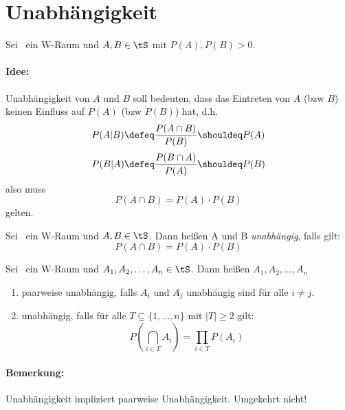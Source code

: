 \section{Unabhängigkeit}
Sei \wraum\ ein W-Raum und $A,B \in \tS$ mit $P(A), P(B) > 0$.

\paragraph{Idee:}
Unabhängigkeit von $A$ und $B$ soll bedeuten, dass das Eintreten von $A$ (bzw $B$)
keinen Einfluss auf $P(A)$ (bzw $P(B)$) hat, d.h.
\begin{equation*}
    P(A|B) \defeq \frac{P(A \cap B)}{P(B)} \shouldeq P(A)
\end{equation*}
\begin{equation*}
    P(B|A) \defeq \frac{P(B \cap A)}{P(A)} \shouldeq P(B)
\end{equation*}
also muss
\begin{equation*}
    P(A \cap B) = P(A) \cdot P(B)
\end{equation*}
gelten.

\begin{definition}[Unabhängigkeit]
    Sei \wraum\ ein W-Raum und $A, B \in \tS$.
    Dann heißen A und B \emph{unabhängig}, falls gilt:
    \begin{equation}
        P(A \cap B) = P(A) \cdot P(B)
    \end{equation}
\end{definition}

\begin{definition}
    Sei \wraum\ ein W-Raum und $A_1, A_2, \dots, A_n \in \tS$.
    Dann heißen $A_1, A_2, \dots, A_n$
    \begin{enumerate}
        \item paarweise unabhängig, falls $A_i$ und $A_j$ unabhängig sind
              für alle $i \neq j$.
        \item unabhängig, falls für alle $T \subseteq \{1, \dots, n\}$
              mit $|T| \geq 2$ gilt:
              \begin{equation*}
                  P\left(\bigcap_{i \in T} A_i \right) = \prod_{i \in T} P\left( A_i \right)
              \end{equation*}
    \end{enumerate}
\end{definition}

\paragraph{Bemerkung:}
Unabhängigkeit impliziert paarweise Unabhängigkeit. Umgekehrt nicht!
